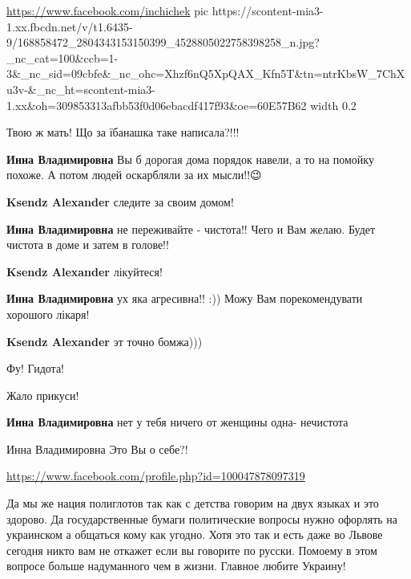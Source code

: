 \url{https://www.facebook.com/inchichek}
\ifcmt
  pic https://scontent-mia3-1.xx.fbcdn.net/v/t1.6435-9/168858472_2804343153150399_4528805022758398258_n.jpg?_nc_cat=100&ccb=1-3&_nc_sid=09cbfe&_nc_ohc=Xhzf6nQ5XpQAX_Kfn5T&tn=ntrKbsW_7ChXu3v-&_nc_ht=scontent-mia3-1.xx&oh=309853313afbb53f0d06ebacdf417f93&oe=60E57B62
  width 0.2
\fi

Твою ж мать! Що за їбанашка таке написала?!!!

\begin{itemize}
\textbf{Инна Владимировна} Вы б дорогая дома порядок навели, а то на помойку похоже. А потом людей оскарбляли за их мысли!!😉

\textbf{Ksendz Alexander} следите за своим домом!

\textbf{Инна Владимировна} не переживайте - чистота!! Чего и Вам желаю. Будет чистота в доме и затем в голове!!

\textbf{Ksendz Alexander} лікуйтеся!

\textbf{Инна Владимировна} ух яка агресивна!! :)) Можу Вам порекомендувати хорошого лікаря!

\textbf{Ksendz Alexander} эт точно бомжа)))

Фу! Гидота!

Жало прикуси!

\textbf{Инна Владимировна} нет у тебя ничего от женщины одна- нечистота

Инна Владимировна Это Вы о себе?!
\end{itemize}

\url{https://www.facebook.com/profile.php?id=100047878097319}

Да мы же нация полиглотов так как с детства говорим на двух языках и это
здорово. Да государственные бумаги политические вопросы нужно офорлять на
украинском а общаться кому как угодно. Хотя это так и есть даже во Львове
сегодня никто вам не откажет если вы говорите по русски. Помоему в этом вопросе
больше надуманного чем в жизни. Главное любите Украину!

